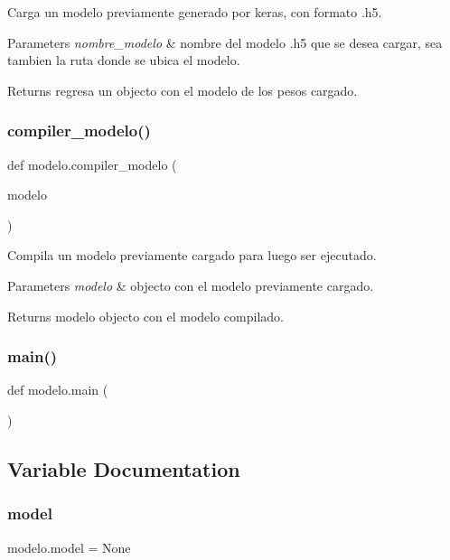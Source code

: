 Carga un modelo previamente generado por keras, con formato .h5. 


\begin{DoxyParams}{Parameters}
{\em nombre\+\_\+modelo} & nombre del modelo .h5 que se desea cargar, sea tambien la ruta donde se ubica el modelo. \\
\hline
\end{DoxyParams}
\begin{DoxyReturn}{Returns}
regresa un objecto con el modelo de los pesos cargado. 
\end{DoxyReturn}
\mbox{\label{namespacemodelo_a4a48c138f410a4c8a4021e2696b7d5c6}} 
\subsubsection{\texorpdfstring{compiler\+\_\+modelo()}{compiler\_modelo()}}
{\footnotesize\ttfamily def modelo.\+compiler\+\_\+modelo (\begin{DoxyParamCaption}\item[{}]{modelo }\end{DoxyParamCaption})}



Compila un modelo previamente cargado para luego ser ejecutado. 


\begin{DoxyParams}{Parameters}
{\em modelo} & objecto con el modelo previamente cargado. \\
\hline
\end{DoxyParams}
\begin{DoxyReturn}{Returns}
modelo objecto con el modelo compilado. 
\end{DoxyReturn}
\mbox{\label{namespacemodelo_acfb71b224c35db75485511e5a7b1ac7d}} 
\subsubsection{\texorpdfstring{main()}{main()}}
{\footnotesize\ttfamily def modelo.\+main (\begin{DoxyParamCaption}{ }\end{DoxyParamCaption})}



\subsection{Variable Documentation}
\mbox{\label{namespacemodelo_abf25581a59085c7c54c1ae4f8bc9eb5e}} 
\subsubsection{\texorpdfstring{model}{model}}
{\footnotesize\ttfamily modelo.\+model = None}

